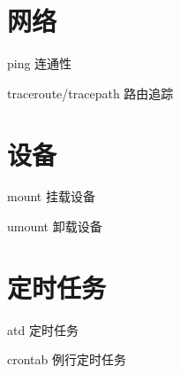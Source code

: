 \documentclass[12pt]{ctexart}
\theoremstyle{definition}
\begin{document}
    \section{网络}

    ping 连通性

    traceroute/tracepath 路由追踪

    \section{设备}

    mount 挂载设备

    umount 卸载设备

    \section{定时任务}

    atd 定时任务

    crontab 例行定时任务
\end{document}
